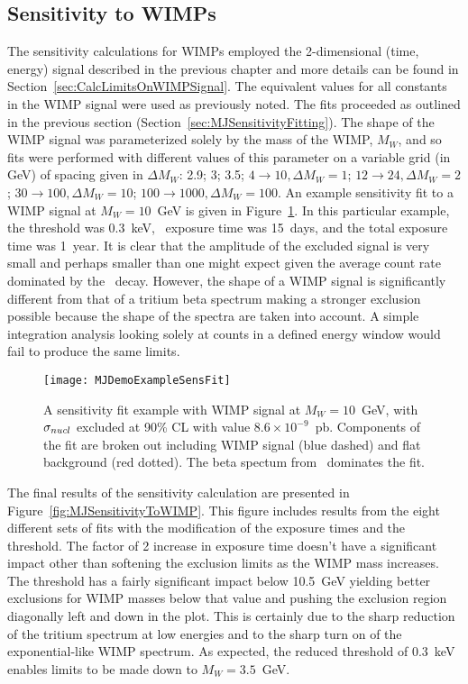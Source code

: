 		\subsection{Sensitivity to WIMPs}
		\label{sec:MJSensitivityToWIMP}
		
	The sensitivity calculations for WIMPs employed the 2-dimensional (time, energy) signal described in the previous chapter and more details can be found in Section~\ref{sec:CalcLimitsOnWIMPSignal}.  The equivalent values for all constants in the WIMP signal were used as previously noted.  The fits proceeded as outlined in the previous section (Section~\ref{sec:MJSensitivityFitting}).  The shape of the WIMP signal was parameterized solely by the mass of the WIMP, $M_{W}$, and so fits were performed with different values of this parameter on a variable grid (in GeV) of spacing given in $\Delta M_{W}$: 2.9; 3; 3.5; $4\to10, \Delta M_{W} = 1$; $12\to24, \Delta M_{W} = 2$; $30\to100, \Delta M_{W} = 10$; $100\to1000, \Delta M_{W} = 100$.  An example sensitivity fit to a WIMP signal at $M_{W}=10$~GeV is given in Figure~\ref{fig:MJSensitivityToWIMPExample}.  In this particular example, the threshold was 0.3~keV, \hthree~exposure time was 15~days, and the total exposure time was 1~year.  It is clear that the amplitude of the excluded signal is very small and perhaps smaller than one might expect given the average count rate dominated by the \hthree~decay.  However, the shape of a WIMP signal is significantly different from that of a tritium beta spectrum making a stronger exclusion possible because the shape of the spectra are taken into account.  A simple integration analysis looking solely at counts in a defined energy window would fail to produce the same limits.  
		
			\begin{figure}
				\centering
				\texttt{[image: MJDemoExampleSensFit]}
				\caption[\MJ~\minmod WIMP sensitivity fit example.]{A sensitivity fit example with WIMP  
				signal at $M_{W}=10$~GeV, with $\sigma_{nucl}$ excluded at 90\% CL with value
				 $8.6\times10^{-9}$~pb.  Components of the fit are broken out including WIMP 
				 signal (blue dashed) and flat background (red dotted).  The beta spectum from \hthree~dominates the fit.}
				\label{fig:MJSensitivityToWIMPExample}
			\end{figure}
	
	The final results of the sensitivity calculation are presented in Figure~\ref{fig:MJSensitivityToWIMP}.  This figure includes results from the eight different sets of fits with the modification of the exposure times and the threshold.  The factor of 2 increase in exposure time doesn't have a significant impact other than softening the exclusion limits as the WIMP mass increases.  The threshold has a fairly significant impact below 10.5~GeV yielding better exclusions for WIMP masses below that value and pushing the exclusion region diagonally left and down in the plot.  This is certainly due to the sharp reduction of the tritium spectrum at low energies and to the sharp turn on of the exponential-like WIMP spectrum.  As expected, the reduced threshold of 0.3~keV enables limits to be made down to $M_{W}=3.5$~GeV.  
	
